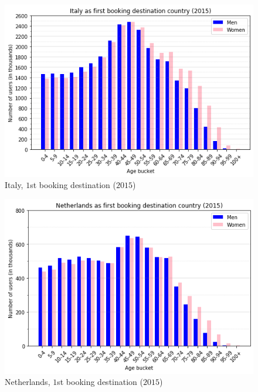 \documentclass[twocolumn, switch]{article}
\begin{document}
\begin{figure}[H]
\centering
\includegraphics[scale=0.35]{../graphs/age_gender_bkts_IT}
\caption{Italy, $1$st booking destination ($2015$)}
\label{fig:italy}
\end{figure}

\begin{figure}[H]
\centering
\includegraphics[scale=0.35]{../graphs/age_gender_bkts_NL}
\caption{Netherlands, $1$st booking destination ($2015$)}
\label{fig:netherlands}
\end{figure}
\end{document}
